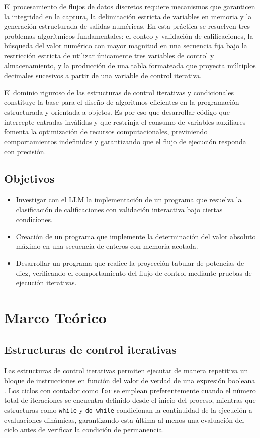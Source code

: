 El procesamiento de flujos de datos discretos requiere mecanismos que garanticen la integridad en la captura, la delimitación estricta de variables en memoria y la generación estructurada de salidas numéricas. En esta práctica se resuelven tres problemas algorítmicos fundamentales: el conteo y validación de calificaciones, la búsqueda del valor numérico con mayor magnitud en una secuencia fija bajo la restricción estricta de utilizar únicamente tres variables de control y almacenamiento, y la producción de una tabla formateada que proyecta múltiplos decimales sucesivos a partir de una variable de control iterativa.

El dominio riguroso de las estructuras de control iterativas y condicionales constituye la base para el diseño de algoritmos eficientes en la programación estructurada y orientada a objetos. Es por eso que desarrollar código que intercepte entradas inválidas y que restrinja el consumo de variables auxiliares fomenta la optimización de recursos computacionales, previniendo comportamientos indefinidos y garantizando que el flujo de ejecución responda con precisión.

\subsection{Objetivos}

\begin{itemize}
    \item Investigar con el LLM la implementación de un programa que resuelva la clasificación de calificaciones con validación interactiva bajo ciertas condiciones.
    
    \item Creación de un programa que implemente la determinación del valor absoluto máximo en una secuencia de enteros con memoria acotada.
    
    \item Desarrollar un programa que realice la proyección tabular de potencias de diez, verificando el comportamiento del flujo de control mediante pruebas de ejecución iterativas.
    
\end{itemize}

\section{Marco Teórico}

\subsection{Estructuras de control iterativas}
Las estructuras de control iterativas permiten ejecutar de manera repetitiva un bloque de instrucciones en función del valor de verdad de una expresión booleana \cite{deitel2016}. Los ciclos con contador como \texttt{for} se emplean preferentemente cuando el número total de iteraciones se encuentra definido desde el inicio del proceso, mientras que estructuras como \texttt{while} y \texttt{do-while} condicionan la continuidad de la ejecución a evaluaciones dinámicas, garantizando esta última al menos una evaluación del ciclo antes de verificar la condición de permanencia.

